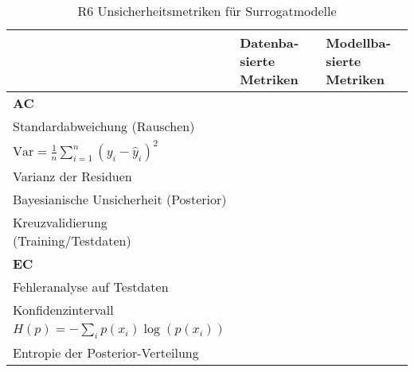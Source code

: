 \begin{otherlanguage}{ngerman}
\begin{table}[htpb]
  \centering
  \begin{tabularx}{\textwidth}{|l|l|X|}
    \hline
    & \textbf{Datenbasierte Metriken} & \textbf{Modellbasierte Metriken} \\
    \hline
    \textbf{AC} & 
    \begin{tabular}[c]{@{}l@{}} 
      \( \sigma = \sqrt{\frac{1}{n} \sum_{i=1}^{n} (y_i - \hat{y}_i)^2} \) \\ 
      Standardabweichung (Rauschen) \\[1ex]
      \( \text{Var} = \frac{1}{n} \sum_{i=1}^{n} (y_i - \hat{y}_i)^2 \) \\ 
      Varianz der Residuen
    \end{tabular}
    & 
    \begin{tabular}[c]{@{}l@{}} 
      \( p(\theta \mid \mathcal{D}) \) \\ 
      Bayesianische Unsicherheit (Posterior) \\[1ex]
      Kreuzvalidierung (Training/Testdaten)
    \end{tabular} \\
    \hline
    \textbf{EC} & 
    \begin{tabular}[c]{@{}l@{}} 
      \( \text{Fehler} = \sum_{i=1}^{n} |y_i - \hat{y}_i| \) \\ 
      Fehleranalyse auf Testdaten
    \end{tabular}
    & 
    \begin{tabular}[c]{@{}l@{}} 
      \( \hat{y} \pm z \cdot \sigma \) \\ 
      Konfidenzintervall \\[1ex]
      \( H(p) = - \sum_{i} p(x_i) \log(p(x_i)) \) \\ 
      Entropie der Posterior-Verteilung
    \end{tabular} \\
    \hline
  \end{tabularx}
  \caption{R6 Unsicherheitsmetriken für Surrogatmodelle}\label{tab:chapter6r61}
\end{table}


\pagebreak


\newpage


\end{otherlanguage}
